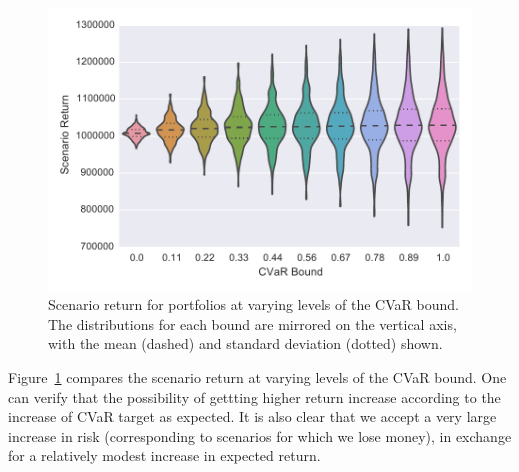 \begin{figure}[tp]
\centering
\includegraphics[width=1.0\textwidth]{../pic/Scenario_Return.pdf}
\caption{Scenario return for portfolios at varying levels of the CVaR bound.
The distributions for each bound are mirrored on the vertical axis, with the mean (dashed) and standard deviation (dotted) shown.}
\label{fig:scenarioreturn}
\end{figure}

Figure~\ref{fig:scenarioreturn} compares the scenario return at varying levels of the CVaR bound.
One can verify that the possibility of gettting higher return increase according to the increase of CVaR target  as expected.
It is also clear that we accept a very large increase in risk (corresponding to scenarios for which we lose money), in exchange for a relatively modest increase in expected return.


